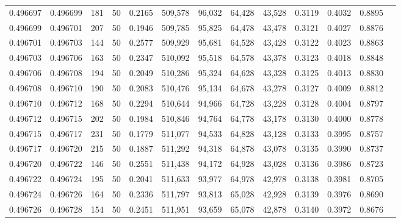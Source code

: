 \begin{tabular}{rrrrrrrrrrrrr}
0.496697 & 0.496699 &   181 &  50 &                                     0.2165 & 509,578 &  96,032 &  64,428 &  43,528 & 0.3119 & 0.4032 & 0.8895 \\
0.496699 & 0.496701 &   207 &  50 &                                     0.1946 & 509,785 &  95,825 &  64,478 &  43,478 & 0.3121 & 0.4027 & 0.8876 \\
0.496701 & 0.496703 &   144 &  50 &                                     0.2577 & 509,929 &  95,681 &  64,528 &  43,428 & 0.3122 & 0.4023 & 0.8863 \\
0.496703 & 0.496706 &   163 &  50 &                                     0.2347 & 510,092 &  95,518 &  64,578 &  43,378 & 0.3123 & 0.4018 & 0.8848 \\
0.496706 & 0.496708 &   194 &  50 &                                     0.2049 & 510,286 &  95,324 &  64,628 &  43,328 & 0.3125 & 0.4013 & 0.8830 \\
0.496708 & 0.496710 &   190 &  50 &                                     0.2083 & 510,476 &  95,134 &  64,678 &  43,278 & 0.3127 & 0.4009 & 0.8812 \\
0.496710 & 0.496712 &   168 &  50 &                                     0.2294 & 510,644 &  94,966 &  64,728 &  43,228 & 0.3128 & 0.4004 & 0.8797 \\
0.496712 & 0.496715 &   202 &  50 &                                     0.1984 & 510,846 &  94,764 &  64,778 &  43,178 & 0.3130 & 0.4000 & 0.8778 \\
0.496715 & 0.496717 &   231 &  50 &                                     0.1779 & 511,077 &  94,533 &  64,828 &  43,128 & 0.3133 & 0.3995 & 0.8757 \\
0.496717 & 0.496720 &   215 &  50 &                                     0.1887 & 511,292 &  94,318 &  64,878 &  43,078 & 0.3135 & 0.3990 & 0.8737 \\
0.496720 & 0.496722 &   146 &  50 &                                     0.2551 & 511,438 &  94,172 &  64,928 &  43,028 & 0.3136 & 0.3986 & 0.8723 \\
0.496722 & 0.496724 &   195 &  50 &                                     0.2041 & 511,633 &  93,977 &  64,978 &  42,978 & 0.3138 & 0.3981 & 0.8705 \\
0.496724 & 0.496726 &   164 &  50 &                                     0.2336 & 511,797 &  93,813 &  65,028 &  42,928 & 0.3139 & 0.3976 & 0.8690 \\
0.496726 & 0.496728 &   154 &  50 &                                     0.2451 & 511,951 &  93,659 &  65,078 &  42,878 & 0.3140 & 0.3972 & 0.8676 \\

\end{tabular}
